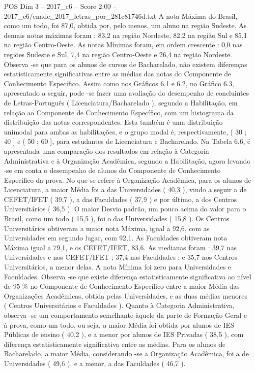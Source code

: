 \begin{textsample}{POS Dim 3 – 2017\_c6 – Score 2.00 – 2017\_c6/enade\_2017\_letras\_por\_281c81746d.txt}
A nota Máxima do Brasil, como um todo, foi 87,0, obtida por, pelo menos, um aluno na região Sudeste.
As demais notas máximas foram : 83,2 na região Nordeste, 82,2 na região Sul e 85,1 na região Centro-Oeste.
As notas Mínimas foram, em ordem crescente : 0,0 nas regiões Sudeste e Sul, 7,4 na região Centro-Oeste e 26,4 na região Nordeste.
Observa -se que para os alunos de cursos de Bacharelado, não existem diferenças estatisticamente significativas entre as médias das notas do Componente de Conhecimento Específico.
Assim como nos Gráficos 6.1 e 6.2, no Gráfico 6.3, apresentado a seguir, pode -se fazer uma avaliação do desempenho de concluintes de Letras-Português ( Licenciatura/Bacharelado ), segundo a Habilitação, em relação ao Componente de Conhecimento Específico, com um histograma da distribuição das notas correspondentes.
Esta também é uma distribuição unimodal para ambas as habilitações, e o grupo modal é, respectivamente, ( 30 ; 40 ] e ( 50 ; 60 ], para estudantes de Licenciatura e Bacharelado.
Na Tabela 6.6, é apresentada uma comparação dos resultados em relação à Categoria Administrativa e à Organização Acadêmica, segundo a Habilitação, agora levando -se em conta o desempenho de alunos do Componente de Conhecimento Específico da prova.
No que se refere à Organização Acadêmica, para os alunos de Licenciatura, a maior Média foi a das Universidades ( 40,3 ), vindo a seguir a de CEFET/IFET ( 39,7 ), a das Faculdades ( 37,9 ) e por último, a dos Centros Universitários ( 36,5 ).
O maior Desvio padrão, um pouco acima do valor para o Brasil, como um todo ( 15,5 ), foi o das Universidades ( 15,8 ).
Os Centros Universitários obtiveram a maior nota Máxima, igual a 92,6, com as Universidades em segundo lugar, com 92,1.
As Faculdades obtiveram nota Máxima igual a 79,1, e os CEFET/IFET, 83,6.
As medianas foram : 39,7 nas Universidades e nos CEFET/IFET ; 37,4 nas Faculdades ; e 35,7 nos Centros Universitários, a menor delas.
A nota Mínima foi zero para Universidades e Faculdades.
Observa -se que existe diferença estatisticamente significativa ao nível de 95 \% no Componente de Conhecimento Específico entre a maior Média das Organizações Acadêmicas, obtida pelas Universidades, e as duas médias menores ( Centros Universitários e Faculdades ).
Quanto à Categoria Administrativa, observa -se um comportamento semelhante àquele da parte de Formação Geral e à prova, como um todo, ou seja, a maior Média foi obtida por alunos de IES Públicas de ensino ( 40,2 ), e a menor por alunos de IES Privadas ( 38,5 ), com diferença estatisticamente significativa entre as médias.
Para os alunos de Bacharelado, a maior Média, considerando -se a Organização Acadêmica, foi a de Universidades ( 49,6 ), e a menor, a das Faculdades ( 46,7 ).

\end{textsample}
